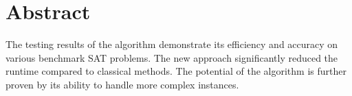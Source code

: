 \documentclass{article}
\begin{document}
\section{Abstract}

The testing results of the algorithm demonstrate its efficiency and accuracy on various benchmark SAT problems. The new approach significantly reduced the runtime compared to classical methods. The potential of the algorithm is further proven by its ability to handle more complex instances.
\end{document}
